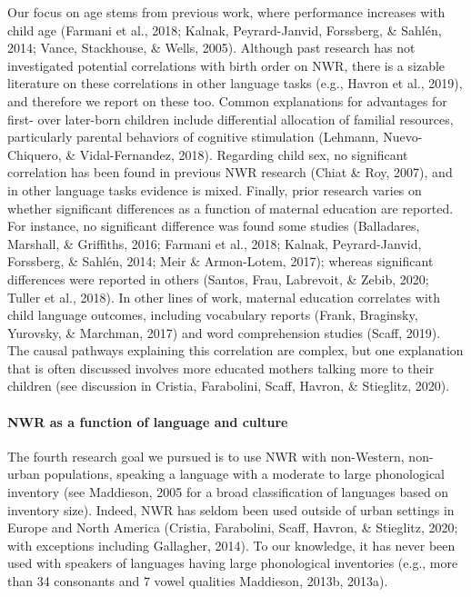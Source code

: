\documentclass[
  american,
  ,man,floatsintext]{apa6}
\let\oldparagraph\paragraph
\renewcommand{\paragraph}[1]{\oldparagraph{#1}\mbox{}}
\begin{document}
Our focus on age stems from previous work, where performance increases with child age (Farmani et al., 2018; Kalnak, Peyrard-Janvid, Forssberg, \& Sahlén, 2014; Vance, Stackhouse, \& Wells, 2005). Although past research has not investigated potential correlations with birth order on NWR, there is a sizable literature on these correlations in other language tasks (e.g., Havron et al., 2019), and therefore we report on these too. Common explanations for advantages for first- over later-born children include differential allocation of familial resources, particularly parental behaviors of cognitive stimulation (Lehmann, Nuevo-Chiquero, \& Vidal-Fernandez, 2018). Regarding child sex, no significant correlation has been found in previous NWR research (Chiat \& Roy, 2007), and in other language tasks evidence is mixed. Finally, prior research varies on whether significant differences as a function of maternal education are reported. For instance, no significant difference was found some studies (Balladares, Marshall, \& Griffiths, 2016; Farmani et al., 2018; Kalnak, Peyrard-Janvid, Forssberg, \& Sahlén, 2014; Meir \& Armon-Lotem, 2017); whereas significant differences were reported in others (Santos, Frau, Labrevoit, \& Zebib, 2020; Tuller et al., 2018). In other lines of work, maternal education correlates with child language outcomes, including vocabulary reports (Frank, Braginsky, Yurovsky, \& Marchman, 2017) and word comprehension studies (Scaff, 2019). The causal pathways explaining this correlation are complex, but one explanation that is often discussed involves more educated mothers talking more to their children (see discussion in Cristia, Farabolini, Scaff, Havron, \& Stieglitz, 2020).

\hypertarget{nwr-as-a-function-of-language-and-culture}{%
\paragraph{NWR as a function of language and culture}\label{nwr-as-a-function-of-language-and-culture}}

The fourth research goal we pursued is to use NWR with non-Western, non-urban populations, speaking a language with a moderate to large phonological inventory (see Maddieson, 2005 for a broad classification of languages based on inventory size). Indeed, NWR has seldom been used outside of urban settings in Europe and North America (Cristia, Farabolini, Scaff, Havron, \& Stieglitz, 2020; with exceptions including Gallagher, 2014). To our knowledge, it has never been used with speakers of languages having large phonological inventories (e.g., more than 34 consonants and 7 vowel qualities Maddieson, 2013b, 2013a).
\end{document}

